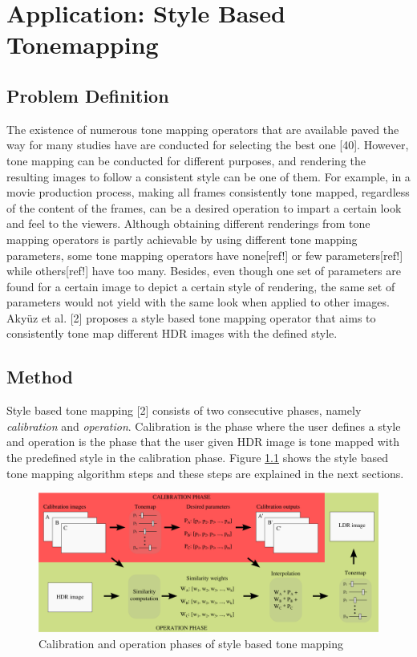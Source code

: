 \chapter{Application: Style Based Tonemapping}
\label{chp:b5}

\section{Problem Definition}

The existence of numerous tone mapping operators that are available paved the way for many studies have are conducted for selecting the best one [40]. However, tone mapping can be conducted for different purposes, and rendering the resulting images to follow a consistent style can be one of them. For example, in a movie production process, making all frames consistently tone mapped, regardless of the content of the frames, can be a desired operation to impart a certain look and feel to the viewers. Although obtaining different renderings from tone mapping operators is partly achievable by using different tone mapping parameters, some tone mapping operators have none[ref!] or few parameters[ref!] while others[ref!] have too many. Besides, even though one set of parameters are found for a certain image to depict a certain style of rendering, the same set of parameters would not yield with the same look when applied to other images. Akyüz et al. [2] proposes a style based tone mapping operator that aims to consistently tone map different HDR images with the defined style.

\section{Method}
Style based tone mapping [2] consists of two consecutive phases, namely \emph{calibration} and \emph{operation}. Calibration is the phase where the user defines a style and operation is the phase that the user given HDR image is tone mapped with the predefined style in the calibration phase. Figure \ref{fig:calibration_operation} shows the style based tone mapping algorithm steps and these steps are explained in the next sections.

\begin{figure}
\begin{center}
\includegraphics[width=\textwidth]{figures/chapter5/temp_calibration_operation.png}
\caption{Calibration and operation phases of style based tone mapping}
\label{fig:calibration_operation}
\end{center}
\end{figure}

